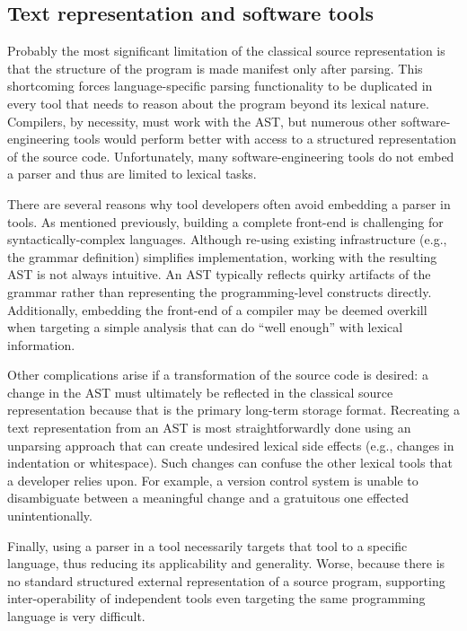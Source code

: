 \documentclass{article}
\begin{document}
\begin{multicols}{2}
\subsection{Text representation and software tools}

Probably the most significant limitation of the classical source
representation is that the structure of the program is made manifest
only after parsing.  This shortcoming forces language-specific parsing
functionality to be duplicated in every tool that needs to reason about
the program beyond its lexical nature.  Compilers, by necessity, must
work with the AST, but numerous other software-engineering tools would
perform better with access to a structured representation of the
source code.  Unfortunately, many software-engineering tools do not
embed a parser and thus are limited to lexical tasks.

There are several reasons why tool developers often avoid embedding a
parser in tools.  As mentioned previously, building a complete front-end
is challenging for syntactically-complex languages.  Although re-using
existing infrastructure (e.g., the grammar definition) simplifies
implementation, working with the resulting AST is not always intuitive.
An AST typically reflects quirky artifacts of the grammar rather than
representing the programming-level constructs directly.  Additionally,
embedding the front-end of a compiler may be deemed overkill when
targeting a simple analysis that can do ``well enough'' with lexical
information.

Other complications arise if a transformation of the source code is
desired: a change in the AST must ultimately be reflected in the
classical source representation because that is the primary long-term
storage format.  Recreating a text representation from an AST is most
straightforwardly done using an unparsing approach that can create
undesired lexical side effects (e.g., changes in indentation or
whitespace).  Such changes can confuse the other lexical tools that a developer relies
upon.  For example, a version control system is unable to disambiguate
between a meaningful change and a gratuitous one effected
unintentionally.  

Finally, using a parser in a tool necessarily targets
that tool to a specific language, thus reducing its applicability and
generality.  Worse, because there is no standard structured external
representation of a source program, supporting inter-operability of
independent tools even targeting the same programming language is very
difficult.


\end{multicols}
\end{document}
